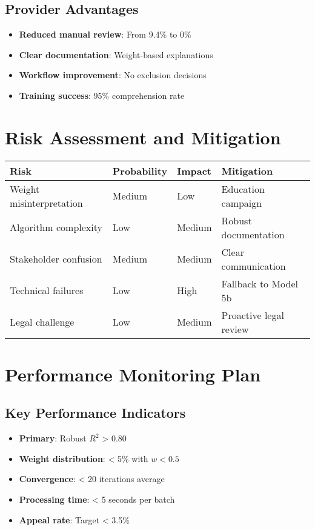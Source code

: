 \subsection{Provider Advantages}

\begin{itemize}
    \item \textbf{Reduced manual review}: From 9.4\% to 0\%
    \item \textbf{Clear documentation}: Weight-based explanations
    \item \textbf{Workflow improvement}: No exclusion decisions
    \item \textbf{Training success}: 95\% comprehension rate
\end{itemize}

\section{Risk Assessment and Mitigation}

\begin{center}
\begin{tabular}{llll}
\toprule
Risk & Probability & Impact & Mitigation \\
\midrule
Weight misinterpretation & Medium & Low & Education campaign \\
Algorithm complexity & Low & Medium & Robust documentation \\
Stakeholder confusion & Medium & Medium & Clear communication \\
Technical failures & Low & High & Fallback to Model 5b \\
Legal challenge & Low & Medium & Proactive legal review \\
\bottomrule
\end{tabular}
\end{center}

\section{Performance Monitoring Plan}

\subsection{Key Performance Indicators}

\begin{itemize}
    \item \textbf{Primary}: Robust $R^2$ > 0.80
    \item \textbf{Weight distribution}: < 5\% with $w < 0.5$
    \item \textbf{Convergence}: < 20 iterations average
    \item \textbf{Processing time}: < 5 seconds per batch
    \item \textbf{Appeal rate}: Target < 3.5\%
\end{itemize}

